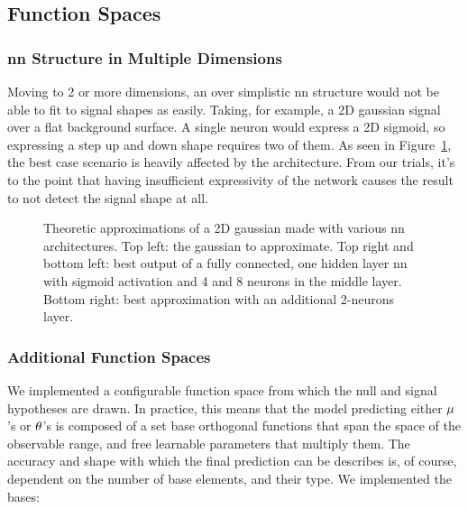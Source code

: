 \documentclass[thesis/Elad_Kliger_Thesis.tex]{subfiles}
\begin{document}
\subsection{Function Spaces}

\subsubsection{\gls{nn} Structure in Multiple Dimensions}
Moving to 2 or more dimensions, an over simplistic \gls{nn} structure would not be able to fit to signal shapes as easily. Taking, for example, a 2D gaussian signal over a flat background surface. A single neuron would express a 2D sigmoid, so expressing a step up and down shape requires two of them. As seen in Figure~\ref{fig:nn-approximations-for-a-2d-gaussian}, the best case scenario is heavily affected by the architecture. From our trials, it's to the point that having insufficient expressivity of the network causes the result to not detect the signal shape at all.

\begin{figure}
    \caption{Theoretic approximations of a 2D gaussian made with various \gls{nn} architectures. Top left: the gaussian to approximate. Top right and bottom left: best output of a fully connected, one hidden layer \gls{nn} with sigmoid activation and 4 and 8 neurons in the middle layer. Bottom right: best approximation with an additional 2-neurons layer.}
    \label{fig:nn-approximations-for-a-2d-gaussian}
\end{figure}

\subsubsection{Additional Function Spaces}
We implemented a configurable function space from which the null and signal hypotheses are drawn. In practice, this means that the model predicting either ${\mu}$'s or ${\theta}$'s is composed of a set base orthogonal functions that span the space of the observable range, and free learnable parameters that multiply them. The accuracy and shape with which the final prediction can be describes is, of course, dependent on the number of base elements, and their type. We implemented the bases:
\end{document}
